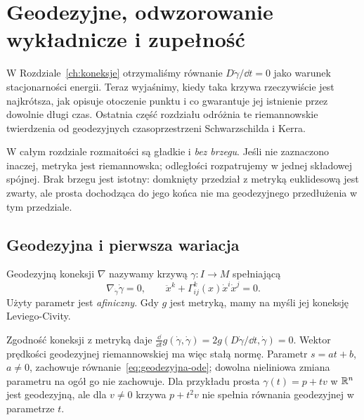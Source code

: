 \chapter{Geodezyjne, odwzorowanie wykładnicze i zupełność}
\label{ch:geodezyjne-exp}

W Rozdziale~\ref{ch:koneksje} otrzymaliśmy równanie
$D\dot\gamma/\dd t=0$ jako warunek stacjonarności
energii. Teraz wyjaśnimy, kiedy taka krzywa
rzeczywiście jest najkrótsza, jak opisuje otoczenie
punktu i co gwarantuje jej istnienie przez dowolnie
długi czas. Ostatnia część rozdziału odróżnia te
riemannowskie twierdzenia od geodezyjnych
czasoprzestrzeni Schwarzschilda i Kerra.

W całym rozdziale rozmaitości są gładkie i \emph{bez brzegu}.
Jeśli nie zaznaczono inaczej, metryka jest riemannowska;
odległości rozpatrujemy w jednej składowej spójnej.
Brak brzegu jest istotny: domknięty przedział z metryką
euklidesową jest zwarty, ale prosta dochodząca do jego
końca nie ma geodezyjnego przedłużenia w tym przedziale.

\section{Geodezyjna i pierwsza wariacja}
\label{sec:geodezyjna-pierwsza-wariacja}

\begin{definicja}[Geodezyjna]
\label{def:geodezyjna}
Geodezyjną koneksji $\nabla$ nazywamy krzywą
$\gamma:I\to M$ spełniającą
\begin{equation}\label{eq:geodezyjna-ode}
 \nabla_{\dot\gamma}\dot\gamma=0,
 \qquad
 \ddot x^k+\Gamma^k_{ij}(x)\dot x^i\dot x^j=0.
\end{equation}
Użyty parametr jest \emph{afiniczny}.
Gdy $g$ jest metryką, mamy na myśli jej
koneksję Leviego-Civity.
\end{definicja}

Zgodność koneksji z metryką daje
$\frac{\dd}{\dd t}g(\dot\gamma,\dot\gamma)
=2g(D\dot\gamma/\dd t,\dot\gamma)=0$.
Wektor prędkości geodezyjnej riemannowskiej ma więc stałą
normę. Parametr $s=at+b$, $a\ne0$,
zachowuje równanie~\eqref{eq:geodezyjna-ode};
dowolna nieliniowa zmiana parametru na ogół
go nie zachowuje. Dla przykładu prosta
$\gamma(t)=p+tv$ w $\mathbb{R}^n$ jest geodezyjną,
ale dla $v\ne0$ krzywa $p+t^2v$ nie spełnia równania geodezyjnej
w parametrze $t$.

